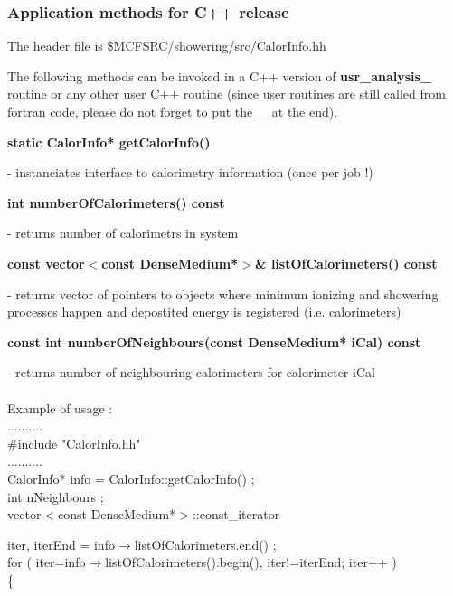 \subsubsection{Application methods for C++ release}

\bigskip

   The header file is \$MCFSRC/showering/src/CalorInfo.hh

   The following methods can be invoked in a C++ version of {\bf usr\_analysis\_}
   routine or any other user C++ routine (since user routines are still called from
   fortran code, please do not forget to put the {\bf \_ } at the end). 

\newpage
\begin{center}
   {\bf static CalorInfo* getCalorInfo() } 
\end{center}
   - instanciates interface to calorimetry information (once per job !)
   
\begin{center}
   {\bf int numberOfCalorimeters() const }
\end{center}
   - returns number of calorimetrs in system 

\begin{center}
   {\bf const vector$<$const DenseMedium*$>$\& listOfCalorimeters() const }
\end{center}
   - returns vector of pointers to objects where minimum ionizing and showering processes
   happen and depostited energy is registered (i.e. calorimeters)
   
\begin{center}
   {\bf const int numberOfNeighbours(const DenseMedium* iCal) const}
\end{center}
   - returns number of neighbouring calorimeters for calorimeter iCal \\
   \\
   Example of usage : \\
   .......... \\
   \#include "CalorInfo.hh" \\
   .......... \\
   CalorInfo* info = CalorInfo::getCalorInfo() ; \\
   int nNeighbours ; \\
   vector$<$const DenseMedium*$>$::const\_iterator
  
      iter, iterEnd = info$\rightarrow$listOfCalorimeters.end() ; \\   
   for ( iter=info$\rightarrow$listOfCalorimeters().begin(), iter!=iterEnd; iter++ ) \\
   \{ 

